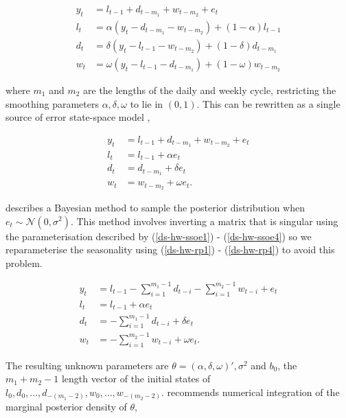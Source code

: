 \documentclass{article}\usepackage[]{graphicx}\usepackage[]{color}
\numberwithin{equation}{section}
\begin{document}
\begin{align}
y_t &= l_{t-1} + d_{t-m_1} + w_{t-m_2} + e_t \label{ds-hw1} \\
l_t &= \alpha (y_t - d_{t-m_1} - w_{t-m_2}) + (1 - \alpha)l_{t-1} \label{ds-hw2}\\
d_t &= \delta (y_t - l_{t-1} - w_{t-m_2}) + (1 - \delta)d_{t-m_1} \label{ds-hw3} \\
w_t &= \omega (y_t - l_{t-1} - d_{t-m_1}) + (1 - \omega)w_{t-m_2} \label{ds-hw4}
\end{align}

where $m_1$ and $m_2$ are the lengths of the daily and weekly cycle, restricting the smoothing parameters $\alpha, \delta, \omega$ to lie in $(0, 1)$. This can be rewritten as a single source of error state-space model \citep{Snyder1985},

\begin{align}
y_t &= l_{t-1} + d_{t-m_1} + w_{t-m_2} + e_t \label{ds-hw-ssoe1} \\
l_t &= l_{t-1} + \alpha e_t \label{ds-hw-ssoe2} \\
d_t &= d_{t-m_1} + \delta e_t \label{ds-hw-ssoe3} \\
w_t &= w_{t-m_2} + \omega e_t \label{ds-hw-ssoe4}. 
\end{align}

\citet{Forbes2000} describes a Bayesian method to sample the posterior distribution  when $e_t \sim \mathcal{N}(0, \sigma^2)$. This method involves inverting a matrix that is singular using the parameterisation described by (\ref{ds-hw-ssoe1}) - (\ref{ds-hw-ssoe4}) so we reparameterise the seasonality using (\ref{ds-hw-rp1}) - (\ref{ds-hw-rp4}) to avoid this problem.

\begin{align}
y_t &= l_{t-1} - \sum_{i = 1}^{m_1 - 1}d_{t-i} - \sum_{i = 1}^{m_2 - 1}w_{t-i} + e_t \label{ds-hw-rp1} \\
l_t &= l_{t-1} + \alpha e_t \label{ds-hw-rp2} \\
d_t &= - \sum_{i = 1}^{m_1 - 1}d_{t-i} + \delta e_t \label{ds-hw-rp3} \\
w_t &= - \sum_{i = 1}^{m_2 - 1}w_{t-i} + \omega e_t \label{ds-hw-rp4}.
\end{align}

The resulting unknown parameters are $\theta = (\alpha, \delta, \omega)', \sigma^2$ and $b_0$, the $m_1 + m_2 - 1$ length vector of the initial states of $l_0, d_0, \dots, d_{-(m_1 - 2)}, w_0, \dots, w_{-(m_2 - 2)}$.
\citet{Forbes2000} recommends numerical integration of the marginal posterior density of $\theta$,
\end{document}
